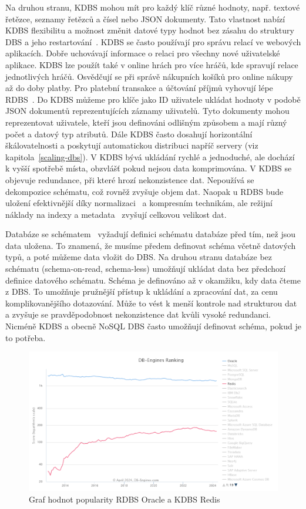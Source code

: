 \documentclass[czech,master,dept460,male,csharp,cpdeclaration]{diploma}
\begin{document}
	Na druhou stranu, KDBS mohou mít pro každý klíč různé hodnoty, např. textové řetězce, seznamy řetězců a čísel nebo JSON dokumenty. Tato vlastnost nabízí KDBS flexibilitu a možnost změnit datové typy hodnot bez zásahu do struktury DBS a jeho restartování~\cite{schemaless-vs-schema-2}. KDBS se často používají pro správu relací ve webových aplikacích. Dobře uchovávají informace o relaci pro všechny nové uživatelské aplikace. KDBS lze použít také v online hrách pro více hráčů, kde spravují relace jednotlivých hráčů. Osvědčují se při správě nákupních košíků pro online nákupy až do doby platby. Pro platební transakce a účtování příjmů vyhovují lépe RDBS~\cite{kdbs-memory}. Do KDBS můžeme pro klíče jako ID uživatele ukládat hodnoty v podobě JSON dokumentů reprezentujících záznamy uživatelů. Tyto dokumenty mohou reprezentovat uživatele, kteří jsou definováni odlišným způsobem a mají různý počet a datový typ atributů. Dále KDBS často dosahují horizontální škálovatelnosti a poskytují automatickou distribuci napříč servery (viz kapitola~\ref{scaling-dbs}). V KDBS bývá ukládání rychlé a jednoduché, ale dochází k vyšší spotřebě místa, obzvlášť pokud nejsou data komprimována. V KDBS se objevuje redundance, při které hrozí nekonzistence dat. Nepoužívá se dekompozice schématu, což rovněž zvyšuje objem dat. Naopak u RDBS bude uložení efektivnější díky normalizaci~\cite{normalizace} a kompresním technikám, ale režijní náklady na indexy a metadata~\cite{metadata} zvyšují celkovou velikost dat.
	
	Databáze se schématem~\cite{schemaless-vs-schema} vyžadují definici schématu databáze před tím, než jsou data uložena. To znamená, že musíme předem definovat schéma včetně datových typů, a poté můžeme data vložit do DBS. Na druhou stranu databáze bez schématu (schema-on-read, schema-less) umožňují ukládat data bez předchozí definice datového schématu. Schéma je definováno až v okamžiku, kdy data čteme z DBS. To umožňuje pružnější přístup k ukládání a zpracování dat, za cenu komplikovanějšího dotazování. Může to vést k menší kontrole nad strukturou dat a zvyšuje se pravděpodobnost nekonzistence dat kvůli vysoké redundanci. Nicméně KDBS a obecně NoSQL DBS často umožňují definovat schéma, pokud je to potřeba.
	
	\begin{figure}
		\centering
		\includegraphics[scale=0.65]{Data/db-engine-trend-dbs.PNG}
		\caption{Graf hodnot popularity RDBS Oracle a KDBS Redis~\cite{dbranking-trend-by-dbs}\label{graf-dbranking-trend-dbs}}
	\end{figure}
	
\end{document}
